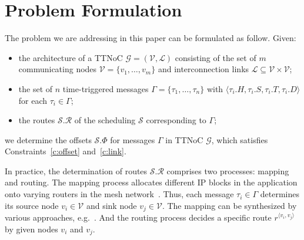 \documentclass[journal]{IEEEtran}
\newcommand{\calG}{\mathcal{G}}
\newcommand{\calV}{\mathcal{V}}
\newcommand{\calL}{\mathcal{L}}
\newcommand{\calS}{\mathcal{S}}
\newcommand{\calR}{\mathcal{R}}
\newcommand{\route}[3]{#1^{\langle #2,#3\rangle}}
\theoremstyle{remark}
\begin{document}
\section{Problem Formulation\label{s:formulation}}
The problem we are addressing in this paper can be formulated as
follow. 
Given:
\begin{itemize}
\item the architecture of a TTNoC $\calG=(\calV,\calL)$ consisting of
  the set of $m$ communicating nodes $\calV=\{v_{1},\dots,v_{m}\}$ and
  interconnection links $\calL \subseteq \calV \times \calV$;
\item the set of $n$ time-triggered messages $\Gamma =
  \{\tau_{1},\dots,\tau_{n} \}$ with $\langle \tau_{i}.H,\tau_{i}.S,
  \tau_{i}.T, \tau_{i}.D\rangle$ for each $\tau_i \in \Gamma$;
\item the routes $\calS.\calR$ of the scheduling $\calS$ corresponding
  to $\Gamma$;
\end{itemize}
we determine the offsets $\calS.\Phi$ for messages $\Gamma$ in TTNoC $\calG$,
 which satisfies Constraints~\ref{c:offset} and~\ref{c:link}.

In practice, the determination of routes $\calS.\calR$ comprises two processes: mapping and routing. 
The mapping process allocates different IP blocks in the application onto varying routers in the mesh network~\cite{DBLP:journals/tjs/WangLY16}.
Thus, each message $\tau_i\in\Gamma$ determines its source node $v_i\in\calV$ and sink node $v_j\in\calV$. 
The mapping can be synthesized by various approaches, e.g.~\cite{DBLP:conf/recosoc/MesidisI11,DBLP:journals/ieiceee/WangLYS16}.  
And the routing process decides a specific route $\route{r}{v_i}{v_j}$ by given nodes $v_i$ and $v_j$.

\end{document}
